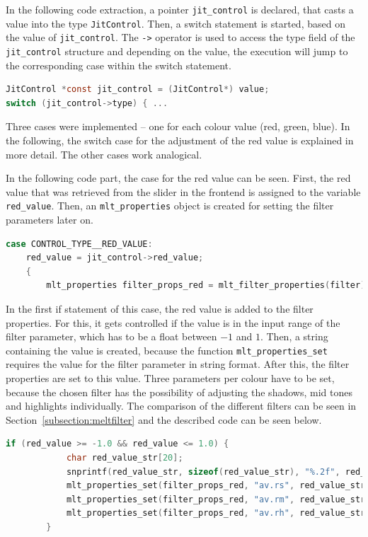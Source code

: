 \documentclass[../MasterThesis.tex]{subfiles}
\begin{document}
In the following code extraction, a pointer \texttt{jit\_control} is declared, that casts a value into the type \texttt{JitControl}.
Then, a switch statement is started, based on the value of \texttt{jit\_control}.
The \texttt{->} operator is used to access the type field of the \texttt{jit\_control} structure and depending on the value, the execution will jump to the corresponding case within the switch statement.

\begin{lstlisting}[language=c, numbers=none, columns=fullflexible]		
JitControl *const jit_control = (JitControl*) value;
switch (jit_control->type) { ...
\end{lstlisting}

Three cases were implemented -- one for each colour value (red, green, blue). In the following, the switch case for the adjustment of the red value is explained in more detail. The other cases work analogical.

In the following code part, the case for the red value can be seen. First, the red value that was retrieved from the slider in the frontend is assigned to the variable \texttt{red\_value}. Then, an \texttt{mlt\_properties} object is created for setting the filter parameters later on. 

\begin{lstlisting}[language=c, numbers=none, columns=fullflexible]			
case CONTROL_TYPE__RED_VALUE:
	red_value = jit_control->red_value;
	{
		mlt_properties filter_props_red = mlt_filter_properties(filter);
\end{lstlisting}

In the first if statement of this case, the red value is added to the filter properties. For this, it gets controlled if the value is in the input range of the filter parameter, which has to be a float between $-1$ and $1$. Then, a string containing the value is created, because the function \texttt{mlt\_properties\_set} requires the value for the filter parameter in string format. After this, the filter properties are set to this value. Three parameters per colour have to be set, because the chosen filter has the possibility of adjusting the shadows, mid tones and highlights individually. 
The comparison of the different filters can be seen in Section~\ref{subsection:meltfilter} and the described code can be seen below.


\begin{lstlisting}[language=c, numbers=none, columns=fullflexible]
		if (red_value >= -1.0 && red_value <= 1.0) {
			char red_value_str[20]; 
			snprintf(red_value_str, sizeof(red_value_str), "%.2f", red_value);
			mlt_properties_set(filter_props_red, "av.rs", red_value_str);
			mlt_properties_set(filter_props_red, "av.rm", red_value_str);
			mlt_properties_set(filter_props_red, "av.rh", red_value_str);
		}	
\end{lstlisting}
\end{document}
